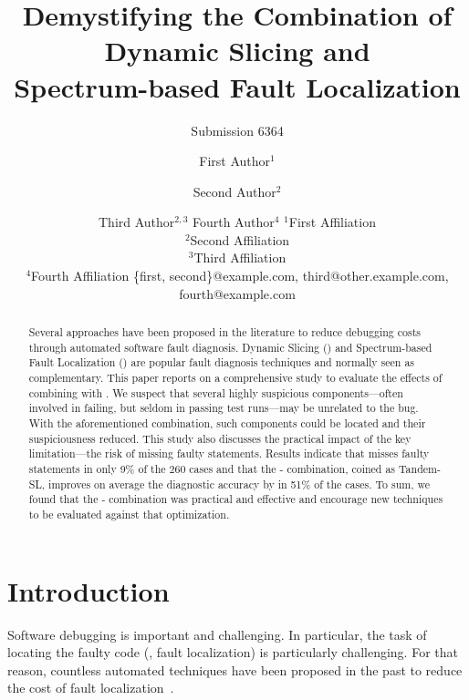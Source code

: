 \documentclass{article}
\title{Demystifying the Combination of Dynamic Slicing and \\ Spectrum-based Fault
Localization}
\author{
    Submission 6364
}
\author{
First Author$^1$
\and
Second Author$^2$\and
Third Author$^{2,3}$\And
Fourth Author$^4$
\affiliations
$^1$First Affiliation\\
$^2$Second Affiliation\\
$^3$Third Affiliation\\
$^4$Fourth Affiliation
\emails
\{first, second\}@example.com,
third@other.example.com,
fourth@example.com
}
\begin{document}
\maketitle

\begin{abstract}
Several approaches have been proposed in the literature to reduce
debugging costs through automated software fault diagnosis.  Dynamic
Slicing (\ds{}) and Spectrum-based Fault Localization (\sfl{}) are
popular fault diagnosis techniques and normally seen as complementary.
This paper reports on a comprehensive study
to evaluate the effects of combining \ds{} with \sfl{}. We suspect
that several highly suspicious components---often involved in failing,
but seldom in passing test runs---may be unrelated to the bug. With
the aforementioned combination, such components could be located and
their suspiciousness reduced.  This study also discusses the practical
impact of the \ds{} key limitation---the risk of missing faulty
statements. Results indicate that \ds{} misses faulty statements in
only 9\% of the 260 cases and that
the \ds{}-\sfl{} combination, coined as Tandem-SL, improves on average
the diagnostic accuracy by  in 51\% of the cases. To sum, we
found that the \ds{}-\sfl{} combination was practical and effective
and encourage new \sfl{} techniques to be evaluated against that
optimization.
\end{abstract}


\section{Introduction}


Software debugging is important and challenging. In particular, the task of
locating the faulty code (\ie{}, fault localization) is particularly
challenging. For that reason, countless automated techniques have been proposed
in the past to reduce the cost of fault localization~\cite{7390282}.
\end{document}
